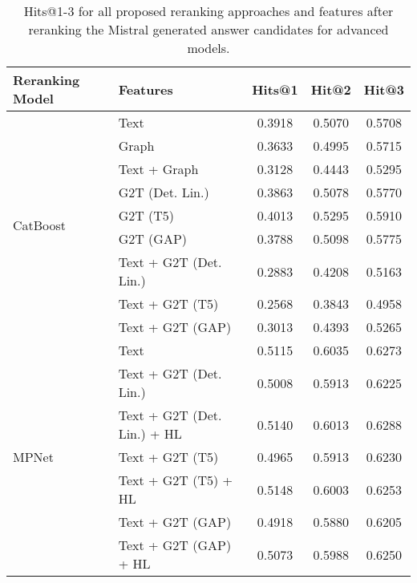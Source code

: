 \begin{table}[htbp]
    \caption{Hits@1-3 for all proposed reranking approaches and features after reranking the Mistral generated answer candidates for advanced models.}
    \label{tab:controllable_fusion:mistral_all_results2}
    \centering
    \begin{tabular}{l p{6cm} c c c}
        \toprule
        \textbf{Reranking Model} & \textbf{Features} & \textbf{Hits@1} & \textbf{Hit@2} & \textbf{Hit@3} \\
        \midrule
        \multirow{9}{*}{CatBoost} & Text & 0.3918 & 0.5070 & 0.5708 \\
        & Graph & 0.3633 & 0.4995 & 0.5715 \\
        & Text + Graph & 0.3128 & 0.4443 & 0.5295 \\
        & G2T (Det. Lin.) & 0.3863 & 0.5078 & 0.5770 \\
        & G2T (T5) & 0.4013 & 0.5295 & 0.5910 \\
        & G2T (GAP) & 0.3788 & 0.5098 & 0.5775 \\
        & Text + G2T (Det. Lin.) & 0.2883 & 0.4208 & 0.5163 \\
        & Text + G2T (T5) & 0.2568 & 0.3843 & 0.4958 \\
        & Text + G2T (GAP) & 0.3013 & 0.4393 & 0.5265 \\
        \midrule
        \multirow{7}{*}{MPNet} & Text & 0.5115 & 0.6035 & 0.6273 \\
        & Text + G2T (Det. Lin.) & 0.5008 & 0.5913 & 0.6225 \\
        & Text + G2T (Det. Lin.) + HL & 0.5140 & 0.6013 & 0.6288 \\
        & Text + G2T (T5) & 0.4965 & 0.5913 & 0.6230 \\
        & Text + G2T (T5) + HL & 0.5148 & 0.6003 & 0.6253 \\
        & Text + G2T (GAP) & 0.4918 & 0.5880 & 0.6205 \\
        & Text + G2T (GAP) + HL & 0.5073 & 0.5988 & 0.6250 \\
        \bottomrule
    \end{tabular}
\end{table}



